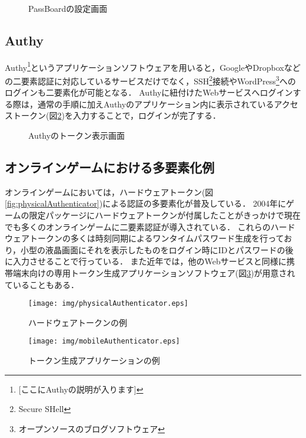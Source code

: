 \begin{figure}[ht]
  \begin{center}
  \end{center}
  \caption{PassBoardの設定画面}
  \label{fig:passboard}
\end{figure}

\subsection{Authy}
Authy\footnote{[ここにAuthyの説明が入ります]}というアプリケーションソフトウェアを用いると，GoogleやDropboxなどの二要素認証に対応しているサービスだけでなく，SSH\footnote{Secure SHell}接続やWordPress\footnote{オープンソースのブログソフトウェア}へのログインも二要素化が可能となる．
Authyに紐付けたWebサービスへログインする際は，通常の手順に加えAuthyのアプリケーション内に表示されているアクセストークン(図\ref{fig:authyiPhone})を入力することで，ログインが完了する．

\begin{figure}[ht]
  \begin{center}
  \end{center}
  \caption{Authyのトークン表示画面}
  \label{fig:authyiPhone}
\end{figure}

\subsection{オンラインゲームにおける多要素化例}
オンラインゲームにおいては，ハードウェアトークン(図\ref{fig:physicalAuthenticator})による認証の多要素化が普及している\cite{DBLP:journals/corr/CristofaroDFN13}．
2004年にゲームの限定パッケージにハードウェアトークンが付属した\cite{Yamane:2011:SOG:2021672.2021743}ことがきっかけで現在でも多くのオンラインゲームに二要素認証が導入されている．
これらのハードウェアトークンの多くは時刻同期によるワンタイムパスワード生成を行っており，小型の液晶画面にそれを表示したものをログイン時にIDとパスワードの後に入力させることで行っている．
また近年では，他のWebサービスと同様に携帯端末向けの専用トークン生成アプリケーションソフトウェア(図\ref{fig:mobileAuthenticator})が用意されていることもある．

\begin{figure}[ht]
  \begin{minipage}{0.5\hsize}
    \begin{center}
      \texttt{[image: img/physicalAuthenticator.eps]}
    \end{center}
    \caption{ハードウェアトークンの例}
    \label{fig:physicalAuthenticator}
  \end{minipage}
  \begin{minipage}{0.5\hsize}
    \begin{center}
      \texttt{[image: img/mobileAuthenticator.eps]}
    \end{center}
    \caption{トークン生成アプリケーションの例}
    \label{fig:mobileAuthenticator}
  \end{minipage}
\end{figure}


\newpage

